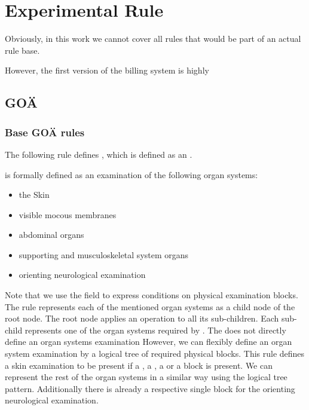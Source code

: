 \section{Experimental Rule }\label{sec:experimental-rule-base}


Obviously, in this work we cannot cover all rules that would be part of an actual rule base.

However, the first version of the billing system is highly

\subsection{GOÄ}
\subsubsection{Base GOÄ rules}

The following rule defines , which is defined as an .




 is formally defined as an examination of the following organ systems:
\begin{itemize}
    \item the Skin
    \item visible mocous membranes
    \item abdominal organs
    \item supporting and musculoskeletal system organs
    \item orienting neurological examination
\end{itemize}

Note that we use the  field to express conditions on physical examination blocks.
The rule represents each of the mentioned organ systems as a child node of the root node.
The root node applies an  operation to all its sub-children.
Each sub-child represents one of the organ systems required by .
The \AVS does not directly define an organ systems examination
However, we can flexibly define an organ system examination by a logical tree of required physical blocks.
This rule defines a skin examination to be present if a , a , a  or a  block is present.
We can represent the rest of the organ systems in a similar way using the logical tree pattern.
Additionally there is already a respective single block for the orienting neurological examination.

